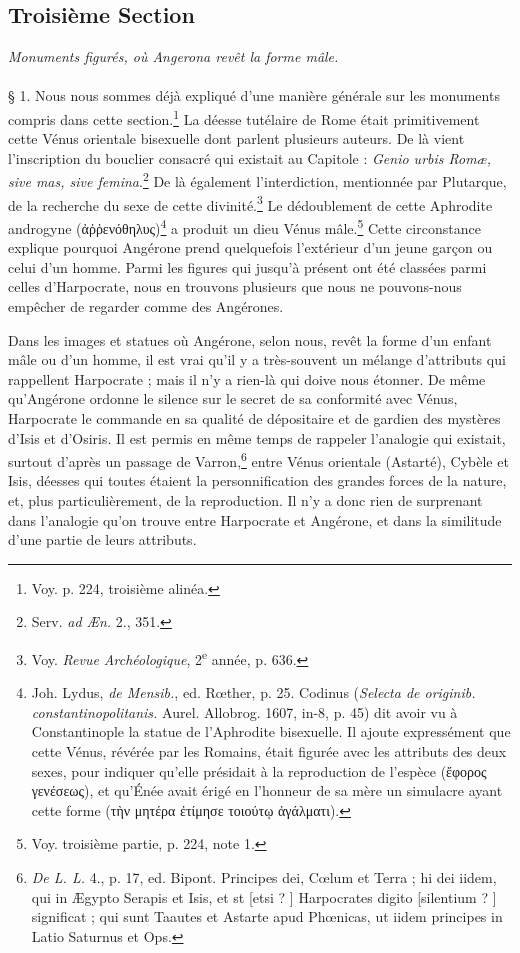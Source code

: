 \documentclass[a4paper, 11pt, oneside, polutonikogreek, french]{article}
\begin{document}
\subsection{Troisième Section}
\begin{center}
\emph{Monuments figurés, où Angerona revêt la forme mâle.}
\end{center}
\paragraph{}
§ 1. Nous nous sommes déjà expliqué d'une manière générale sur les monuments compris dans cette section.\footnote{Voy. p. 224, troisième alinéa.} La déesse tutélaire de Rome était primitivement cette Vénus orientale bisexuelle dont parlent plusieurs auteurs. De là vient l'inscription du bouclier consacré qui existait au Capitole : \emph{Genio urbis Romæ, sive mas, sive femina}.\footnote{Serv. \emph{ad Æn.} 2., 351.} De là également l'interdiction, mentionnée par Plutarque, de la recherche du sexe de cette divinité.\footnote{Voy. \emph{Revue Archéologique}, 2\textsuperscript{e} année, p. 636.} Le dédoublement de cette Aphrodite androgyne (ἀῤῥενόθηλυς)\footnote{Joh. Lydus, \emph{de Mensib.}, ed. Rœther, p. 25. Codinus (\emph{Selecta de originib. constantinopolitanis.} Aurel. Allobrog. 1607, in-8, p. 45) dit avoir vu à Constantinople la statue de l'Aphrodite bisexuelle. Il ajoute expressément que cette Vénus, révérée par les Romains, était figurée avec les attributs des deux sexes, pour indiquer qu'elle présidait à la reproduction de l'espèce (ἔφορος γενέσεως), et qu'Énée avait érigé en l'honneur de sa mère un simulacre ayant cette forme (τὴν μητέρα ἐτίμησε τοιούτῳ ἀγάλματι).} a produit un dieu Vénus mâle.\footnote{Voy. troisième partie, p. 224, note 1.} Cette circonstance explique pourquoi Angérone prend quelquefois l'extérieur d'un jeune garçon ou celui d'un homme. Parmi les figures qui jusqu'à présent ont été classées parmi celles d'Harpocrate, nous en trouvons plusieurs que nous ne pouvons-nous empêcher de regarder comme des Angérones.

Dans les images et statues où Angérone, selon nous, revêt la forme d'un enfant mâle ou d'un homme, il est vrai qu'il y a très-souvent un mélange d'attributs qui rappellent Harpocrate ; mais il n'y a rien-là qui doive nous étonner. De même qu'Angérone ordonne le silence sur le secret de sa conformité avec Vénus, Harpocrate le commande en sa qualité de dépositaire et de gardien des mystères d'Isis et d'Osiris. Il est permis en même temps de rappeler l'analogie qui existait, surtout d'après un passage de Varron,\footnote{\emph{De L. L.} 4., p. 17, ed. Bipont. Principes dei, Cœlum et Terra ; hi dei iidem, qui in Ægypto Serapis et Isis, et st [etsi ? ] Harpocrates digito [silentium ? ] significat ; qui sunt Taautes et Astarte apud Phœnicas, ut iidem principes in Latio Saturnus et Ops.} entre Vénus orientale (Astarté), Cybèle et Isis, déesses qui toutes étaient la personnification des grandes forces de la nature, et, plus particulièrement, de la reproduction. Il n'y a donc rien de surprenant dans l'analogie qu'on trouve entre Harpocrate et Angérone, et dans la similitude d'une partie de leurs attributs.
\end{document}
